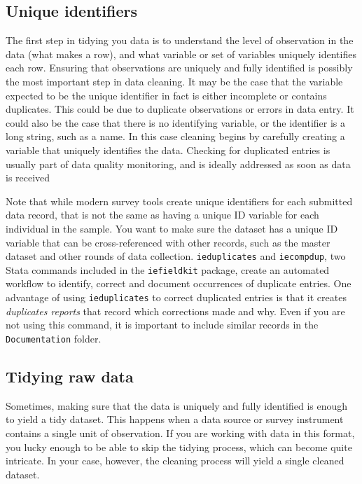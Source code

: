 \subsection{Unique identifiers}

The first step in tidying you data is to understand the level of observation in the data (what makes a row),
and what variable or set of variables uniquely identifies each row.
Ensuring that observations are uniquely and fully identified
is possibly the most important step in data cleaning.
It may be the case that the variable expected to be the unique identifier in fact is either incomplete or contains duplicates.
This could be due to duplicate observations or errors in data entry.
It could also be the case that there is no identifying variable, or the identifier is a long string, such as a name.
In this case cleaning begins by carefully creating a variable that uniquely identifies the data.
Checking for duplicated entries is usually part of data quality monitoring,
and is ideally addressed as soon as data is received

Note that while modern survey tools create unique identifiers for each submitted data record,
that is not the same as having a unique ID variable for each individual in the sample.
You want to make sure the dataset has a unique ID variable
that can be cross-referenced with other records, such as the master dataset
and other rounds of data collection.
\texttt{ieduplicates} and \texttt{iecompdup},
two Stata commands included in the \texttt{iefieldkit}
package,
create an automated workflow to identify, correct and document
occurrences of duplicate entries.
One advantage of using \texttt{ieduplicates} 
to correct duplicated entries is that it creates \textit{duplicates reports}
that record which corrections made and why.
Even if you are not using this command,
it is important to include similar records in the \texttt{Documentation} folder.

\subsection{Tidying raw data}

Sometimes, making sure that the data is uniquely and fully identified 
is enough to yield a tidy dataset.
This happens when a data source or survey instrument
contains a single unit of observation.
If you are working with data in this format,
you lucky enough to be able to skip the tidying process,
which can become quite intricate.
In your case, however, the cleaning process will yield a single cleaned dataset.

